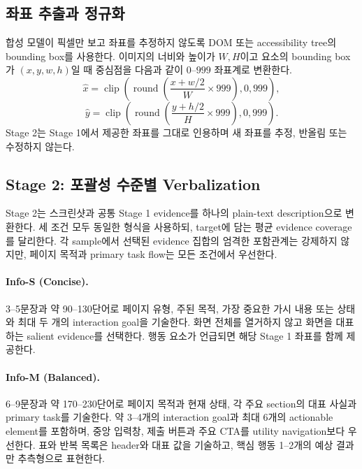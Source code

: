 \subsection{좌표 추출과 정규화}

합성 모델이 픽셀만 보고 좌표를 추정하지 않도록 DOM 또는 accessibility
tree의 bounding box를 사용한다. 이미지의 너비와 높이가 $W,H$이고
요소의 bounding box가 $(x,y,w,h)$일 때 중심점을 다음과 같이
$0$--$999$ 좌표계로 변환한다.
\begin{equation}
\hat{x}=\operatorname{clip}\!\left(
\operatorname{round}\left(\frac{x+w/2}{W}\times999\right),0,999\right),
\end{equation}
\begin{equation}
\hat{y}=\operatorname{clip}\!\left(
\operatorname{round}\left(\frac{y+h/2}{H}\times999\right),0,999\right).
\end{equation}
Stage 2는 Stage 1에서 제공한 좌표를 그대로 인용하며 새 좌표를 추정,
반올림 또는 수정하지 않는다.

\subsection{Stage 2: 포괄성 수준별 Verbalization}

Stage 2는 스크린샷과 공통 Stage 1 evidence를 하나의 plain-text
description으로 변환한다. 세 조건 모두 동일한 형식을 사용하되,
target에 담는 평균 evidence coverage를 달리한다. 각 sample에서
선택된 evidence 집합의 엄격한 포함관계는 강제하지 않지만, 페이지
목적과 primary task flow는 모든 조건에서 우선한다.

\paragraph{Info-S (Concise).}
3--5문장과 약 90--130단어로 페이지 유형, 주된 목적, 가장 중요한
가시 내용 또는 상태와 최대 두 개의 interaction goal을 기술한다.
화면 전체를 열거하지 않고 화면을 대표하는 salient evidence를
선택한다. 행동 요소가 언급되면 해당 Stage 1 좌표를 함께 제공한다.

\paragraph{Info-M (Balanced).}
6--9문장과 약 170--230단어로 페이지 목적과 현재 상태, 각 주요
section의 대표 사실과 primary task를 기술한다. 약 3--4개의
interaction goal과 최대 6개의 actionable element를 포함하며, 중앙
입력창, 제출 버튼과 주요 CTA를 utility navigation보다 우선한다.
표와 반복 목록은 header와 대표 값을 기술하고, 핵심 행동 1--2개의
예상 결과만 추측형으로 표현한다.

